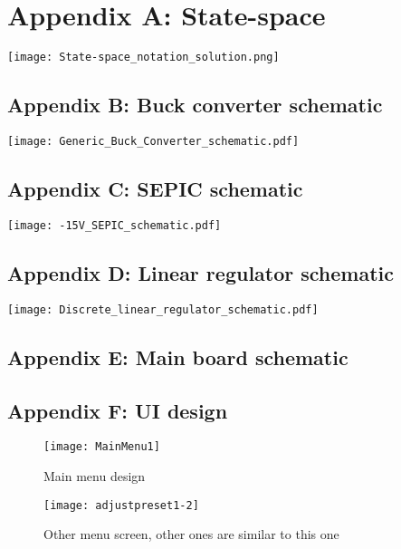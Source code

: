 \chapter*{Appendix A: State-space}
\label{chap:appendix-A-statespace}


    \texttt{[image: State-space\_notation\_solution.png]}
\newpage
\newpage

\section*{Appendix B: Buck converter schematic}
\texttt{[image: Generic\_Buck\_Converter\_schematic.pdf]}

\section*{Appendix C: SEPIC schematic}
\texttt{[image: -15V\_SEPIC\_schematic.pdf]}

\section*{Appendix D: Linear regulator schematic}
\texttt{[image: Discrete\_linear\_regulator\_schematic.pdf]}

\section*{Appendix E: Main board schematic}


\section*{Appendix F: UI design} \label{AppendixF}
\begin{figure}[ht]
    \texttt{[image: MainMenu1]}
    \caption{Main menu design}
    \label{fig:mainmenu}
\end{figure}

\begin{figure}[ht]
    \texttt{[image: adjustpreset1-2]}
    \caption{Other menu screen, other ones are similar to this one}
    \label{fig:adjustpresetmenu}
\end{figure}

